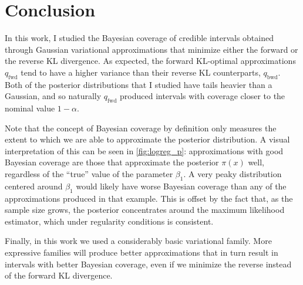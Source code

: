 \section{Conclusion} \label{sec:conclusion}

In this work,
I studied the Bayesian coverage of credible intervals
obtained through Gaussian variational approximations that minimize
either the forward or the reverse KL divergence.
As expected,
the forward KL-optimal approximations $q_\mathrm{fwd}$
tend to have a higher variance than their reverse KL counterparts,
$q_\mathrm{bwd}$.
Both of the posterior distributions that I studied have tails heavier
than a Gaussian, and so naturally $q_\mathrm{fwd}$ produced intervals
with coverage closer to the nominal value $1-\alpha$.

Note that the concept of Bayesian coverage by definition
only measures the extent to which we are able to approximate
the posterior distribution.
A visual interpretation of this can be seen in \cref{fig:logreg_p}:
approximations with good Bayesian coverage are those that
approximate the posterior $\pi(x)$ well,
regardless of the ``true'' value of the parameter $\beta_1$.
A very peaky distribution centered around $\beta_1$
would likely have worse Bayesian coverage than any of the
approximations produced in that example.
This is offset by the fact that,
as the sample size grows,
the posterior concentrates around the maximum likelihood estimator,
which under regularity conditions is consistent.

Finally, in this work we used a considerably basic variational family.
More expressive families will produce better approximations
that in turn result in intervals with better Bayesian coverage,
even if we minimize the reverse instead of the forward KL divergence.

